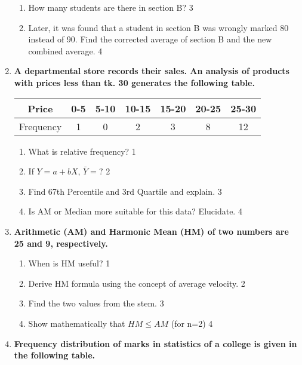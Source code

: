 \documentclass[a4paper,oneside]{book}
\begin{document}
\begin{enumerate}
\begin{enumerate}
    \item  
    How many students are there in section B? \hfill 3
    \item
    Later, it was found that a student in section B was wrongly marked 80 instead of 90. Find the corrected average of section B and the new combined average. \hfill 4
\end{enumerate}


     \item
	  \textbf{A departmental store records their sales. An analysis of products with prices less than tk. 30 generates the following table.} 
	  
\begin{table}[H]
\centering
\begin{tabular}{c|c|c|c|c|c|c}
Price     & 0-5 & 5-10 & 10-15 & 15-20 & 20-25 & 25-30 \\ \hline
Frequency & 1   & 0    & 2     & 3     & 8     & 12   
\end{tabular}
\end{table}
  
  \begin{enumerate}
    \item
	What is relative frequency? \hfill 1
    \item
	If $Y = a + bX$, $\bar Y = ?$ \hfill 2
    \item  
	Find 67th Percentile and 3rd Quartile and explain. \hfill 3
    \item
	Is AM or Median more suitable for this data? Elucidate. \hfill 4
  \end{enumerate}

   \item
	  \textbf{Arithmetic (AM) and Harmonic Mean (HM) of two numbers are 25 and 9, respectively.} 
    \begin{enumerate}
    \item
	When is HM useful? \hfill 1
    \item
	Derive HM formula using the concept of average velocity. \hfill 2
    \item  
	Find the two values from the stem. \hfill 3
    \item
	Show mathematically that $HM \le AM$ (for n=2) \hfill 4
  \end{enumerate}

   \item
  \textbf{Frequency distribution of marks in statistics of a college is given in the following table.}
 


\end{enumerate}
\end{document}
